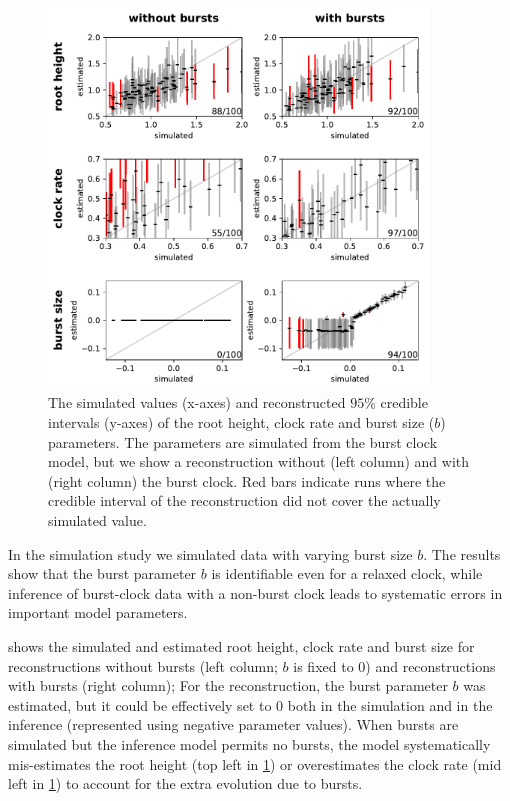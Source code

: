 \documentclass[]{rsos}%
\begin{document}
\begin{figure}
    \centering
    \includegraphics[width=0.9\textwidth]{supplement/simulation_study/coverage.pdf}
    \caption{The simulated values (x-axes) and reconstructed $95\%$ credible intervals (y-axes) of the root height, clock rate and burst size ($b$) parameters. The parameters are simulated from the burst clock model, but we show a reconstruction without (left column) and with (right column) the burst clock. Red bars indicate runs where the credible interval of the reconstruction did not cover the actually simulated value.}
    \label{f:simulation}
\end{figure}

In the simulation study we simulated data with varying burst size $b$. The results show that the burst parameter $b$ is identifiable even for a relaxed clock, while inference of burst-clock data with a non-burst clock leads to systematic errors in important model parameters.

 shows the simulated and estimated root height, clock rate and burst size for reconstructions without bursts (left column; $b$ is fixed to $0$) and reconstructions with bursts (right column); For the reconstruction, the burst parameter $b$ was estimated, but it could be effectively set to $0$ both in the simulation and in the inference (represented using negative parameter values).
When bursts are simulated but the inference model permits no bursts, the model systematically mis-estimates the root height (top left in \cref{f:simulation}) or overestimates the clock rate (mid left in \cref{f:simulation}) to account for the extra evolution due to bursts.
\end{document}
